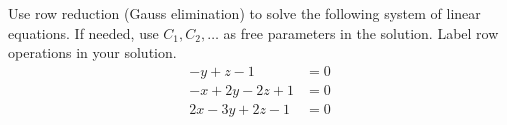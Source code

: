 \documentclass[10pt,twoside,sfsidenotes]{tufte-handout}
\begin{document}
\fancyhead[R]{}
\begin{fullwidth}
  \begin{question} %
    Use row reduction (Gauss elimination) to solve the following system of linear equations.
    If needed, use \(C_{1}, C_{2},\dots\) as free parameters in the solution. Label row operations in your solution.
    \begin{align*}
      -y + z -1 &= 0 \\
      -x + 2y -2z + 1 &= 0  \\
      2x -3y + 2z -1 & = 0 \\
    \end{align*}
  \end{question}
\end{fullwidth}
\end{document}

